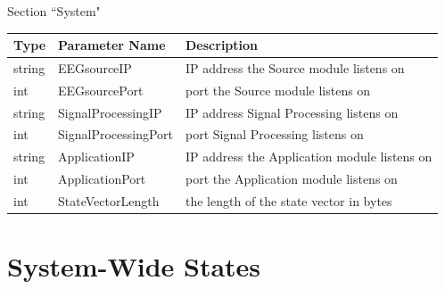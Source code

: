 \documentclass[letterpaper,oneside,12pt]{book}
\begin{document}
\begin{flushleft}

\vspace{.5cm}
\large Section ``System" \normalsize \\[1ex]

 \begin{tabular}{|l|l|l|}
  \hline
  \textbf{Type} & \textbf{Parameter Name} & \textbf{Description}\\
  \hline
  string & EEGsourceIP & IP address the Source module listens on\\  
  \hline
  int & EEGsourcePort & port the Source module listens on\\  
  \hline
  string & SignalProcessingIP & IP address Signal Processing listens on\\  
  \hline
  int & SignalProcessingPort & port Signal Processing listens on\\  
  \hline
  string & ApplicationIP & IP address the Application module listens on\\  
  \hline
  int & ApplicationPort & port the Application module listens on\\  
  \hline
  int & StateVectorLength & the length of the state vector in bytes\\  
  \hline
 \end{tabular}

\end{flushleft}


\section{System-Wide States}
\label{states}
\end{document}
